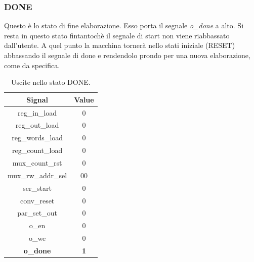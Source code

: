 \documentclass[a4paper]{report}
\begin{document}
\subsubsection{DONE}
Questo è lo stato di fine elaborazione. Esso porta il segnale \textit{o\_done} a alto. Si resta in questo stato fintantochè il segnale di start non viene riabbassato dall'utente. A quel punto la macchina tornerà nello stati iniziale (RESET) abbassando il segnale di done e rendendolo prondo per una nuova elaborazione, come da specifica.
\begin{table}[H]
  \centering
  \begin{tabular}{||c | c||} 
    \hline
    Signal & Value \\
    \hline\hline
    reg\_in\_load & 0 \\
    reg\_out\_load & 0 \\
    reg\_words\_load & 0 \\
    reg\_count\_load & 0 \\
    mux\_count\_rst & 0 \\
    mux\_rw\_addr\_sel & 00 \\
    ser\_start & 0 \\
    conv\_reset & 0 \\
    par\_set\_out & 0 \\
    o\_en & 0 \\
    o\_we & 0 \\
    \textbf{o\_done} & \textbf{1} \\
   \hline
  \end{tabular}
  \caption{Uscite nello stato DONE.}
  \label{table:11}
\end{table}
\end{document}
